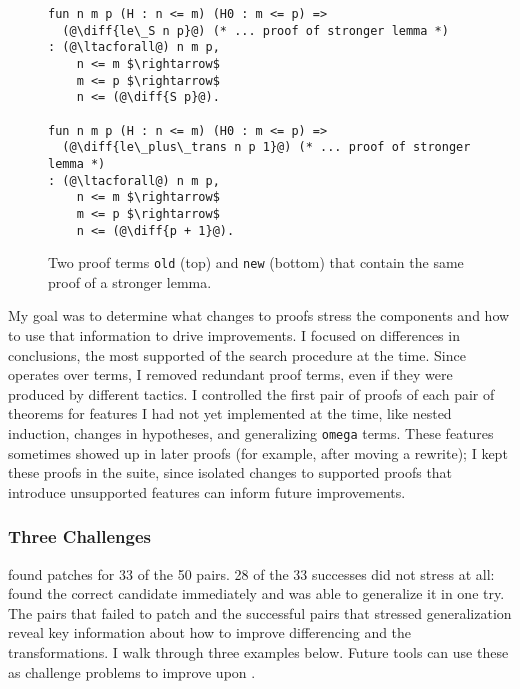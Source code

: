 \begin{figure*}
\begin{lstlisting}[language=coq]
fun n m p (H : n <= m) (H0 : m <= p) =>
  (@\diff{le\_S n p}@) (* ... proof of stronger lemma *)
: (@\ltacforall@) n m p,
    n <= m $\rightarrow$
    m <= p $\rightarrow$
    n <= (@\diff{S p}@).

fun n m p (H : n <= m) (H0 : m <= p) =>
  (@\diff{le\_plus\_trans n p 1}@) (* ... proof of stronger lemma *)
: (@\ltacforall@) n m p,
    n <= m $\rightarrow$
    m <= p $\rightarrow$
    n <= (@\diff{p + 1}@).
\end{lstlisting}
\caption{Two proof terms \lstinline{old} (top) and \lstinline{new} (bottom) that contain the same proof of a stronger lemma.}
\label{fig:stronger}
\end{figure*}

My goal was to determine what changes to proofs stress the components
and how to use that information to drive improvements.
I focused on differences in conclusions, the most supported  of the search procedure at the time.
Since \sysname operates over terms,
I removed redundant proof terms, even if they were produced by different tactics.
I controlled the first pair of proofs of each pair of theorems for features I had not yet implemented at the time,
like nested induction, changes in hypotheses, and generalizing \lstinline{omega} terms.
These features sometimes showed up in later proofs (for example, after moving a rewrite);
I kept these proofs in the suite, since isolated changes to supported proofs that
introduce unsupported features can inform future improvements.	

\subsubsection{Three Challenges}
\label{sec:fail}

\sysname found patches for 33 of the 50 pairs. 28 of the 33 successes
did not stress \sysname at all: \sysname found the correct candidate immediately and was able to generalize it
in one try.
The pairs that \sysname failed to patch and the successful pairs that stressed generalization
reveal key information about how to improve differencing and the transformations.
I walk through three examples below.
Future tools can use these as challenge problems to improve upon \sysname.

